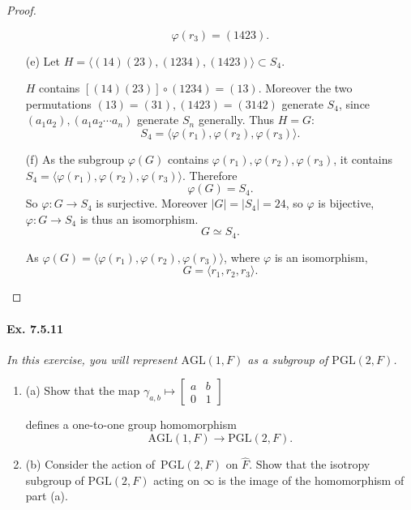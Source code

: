 \documentclass[11pt,a4paper]{article}
\newcommand{\be} {\begin{enumerate}}
\newcommand{\ee} {\end{enumerate}}
\begin{document}
\begin{proof}
\begin{enumerate}
$$\varphi(r_3) = (1 4 2 3).$$

\item[(e)] Let $H = \langle (1 4)(2 3), (1 2 3 4), (1 4 2 3) \rangle \subset S_4$.

$H$ contains $[(1 4)(2 3)] \circ (1 2 3 4 ) = (1 3)$. Moreover the two permutations $(1 3) = ( 3 1), (1 4 2 3) = (3 1 4 2)$ generate $S_4$, since $(a_1 a_2), (a_1 a_2 \cdots a_n)$ generate $S_n$ generally. Thus $H = G$:
$$S_4 = \langle \varphi(r_1), \varphi(r_2), \varphi(r_3) \rangle.$$

\item[(f)] 
As the subgroup $\varphi(G)$ contains $\varphi(r_1), \varphi(r_2), \varphi(r_3)$, it contains $S_4 = \langle \varphi(r_1), \varphi(r_2), \varphi(r_3) \rangle$. Therefore
$$\varphi(G) = S_4.$$
So $\varphi : G \to S_4$ is surjective. Moreover $\vert G \vert = \vert S_4 \vert = 24$, so $\varphi$ is bijective, $\varphi :G \to S_4$ is thus an isomorphism.
$$G \simeq S_4.$$

As $\varphi(G) = \langle \varphi(r_1), \varphi(r_2), \varphi(r_3) \rangle$, where $\varphi$  is an isomorphism,
$$G = \langle r_1,r_2,r_3 \rangle.$$
\end{enumerate}
\end{proof}

\paragraph{Ex. 7.5.11}

{\it In this exercise, you will represent $\mathrm{AGL}(1,F)$ as a subgroup of $\mathrm{PGL}(2,F)$.
\be
\item[(a)] Show that the map $\gamma_{a,b} \mapsto  \left[
\begin{array}{ccc}
 a &   b   \\
  0&   1      
\end{array}
\right] $

defines a one-to-one group homomorphism
$$\mathrm{AGL}(1,F) \to \mathrm{PGL}(2,F).$$
\item[(b)] Consider the action of $\, \mathrm{PGL}(2,F)$ on $\hat{F}$. Show that the isotropy subgroup of $\mathrm{PGL}(2,F)$ acting on $\infty$ is the image of the homomorphism of part (a).
\ee
}
\end{document}
